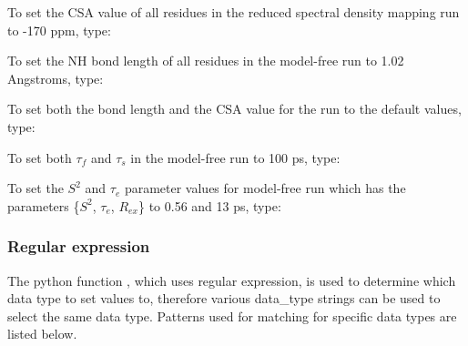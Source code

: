 To set the CSA value of all residues in the reduced spectral density mapping  run 
 to
-170 ppm, type:





To set the NH bond length  of all residues in the model-free run 
 to 1.02 Angstroms,
type:





To set both the bond length  and the CSA value for the run 
 to the default values, type:




To set both $\tau_f$ and $\tau_s$ in the model-free run 
 to 100 ps, type:





To set the $S^2$ and $\tau_e$ parameter values for model-free run 
 which has the parameters
\{$S^2$, $\tau_e$, $R_{ex}$\} to 0.56 and 13 ps, type:








\subsubsection{Regular expression}

The python  function 
, which uses regular expression,  is used to determine which data
type to set values to, therefore various data\_type strings can be used to select the same
data type.  Patterns used for matching for specific data types are listed below.

